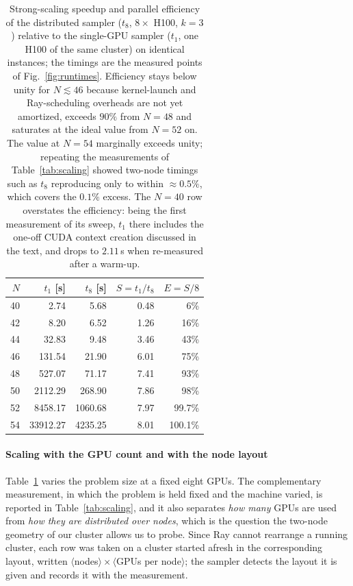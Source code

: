 \documentclass[12pt,a4paper]{elsarticle}
\begin{document}
\begin{table}[H]
\centering
\begin{tabular}{|r|r|r|r|r|}
\hline
$N$ & $t_1$ [s] & $t_8$ [s] & $S=t_1/t_8$ & $E=S/8$ \\
\hline
40 & 2.74      & 5.68     & 0.48 & 6\% \\
42 & 8.20      & 6.52     & 1.26 & 16\% \\
44 & 32.83     & 9.48     & 3.46 & 43\% \\
46 & 131.54    & 21.90    & 6.01 & 75\% \\
48 & 527.07    & 71.17    & 7.41 & 93\% \\
50 & 2112.29   & 268.90   & 7.86 & 98\% \\
52 & 8458.17   & 1060.68  & 7.97 & 99.7\% \\
54 & 33912.27  & 4235.25  & 8.01 & 100.1\% \\
\hline
\end{tabular}
\caption{Strong-scaling speedup and parallel efficiency of the distributed
sampler ($t_8$, $8\times$ H100, $k=3$) relative to the single-GPU sampler
($t_1$, one H100 of the same cluster) on identical instances; the timings are the
measured points of Fig.~\ref{fig:runtimes}. Efficiency stays below unity for
$N \lesssim 46$ because kernel-launch and Ray-scheduling overheads are not yet
amortized, exceeds $90\%$ from $N=48$ and saturates at the ideal value from
$N=52$ on. The value at $N=54$ marginally exceeds unity; repeating the measurements of
Table~\ref{tab:scaling} showed two-node timings such as $t_8$ reproducing only to within
$\approx\!0.5\%$, which covers the $0.1\%$ excess. The $N=40$ row overstates the efficiency:
being the first measurement of its sweep, $t_1$ there includes the one-off CUDA
context creation discussed in the text, and drops to $2.11$\,s when re-measured
after a warm-up.}
\label{tab:efficiency}
\end{table}

\paragraph{Scaling with the GPU count and with the node layout}
Table~\ref{tab:efficiency} varies the problem size at a fixed eight GPUs. The complementary
measurement, in which the problem is held fixed and the machine varied, is reported in
Table~\ref{tab:scaling}, and it also separates \emph{how many} GPUs are used from \emph{how
they are distributed over nodes}, which is the question the two-node geometry of our cluster
allows us to probe. Since Ray cannot rearrange a running cluster, each row was taken on a
cluster started afresh in the corresponding layout, written $\langle$nodes$\rangle\times
\langle$GPUs per node$\rangle$; the sampler detects the layout it is given and records it with
the measurement.
\end{document}
